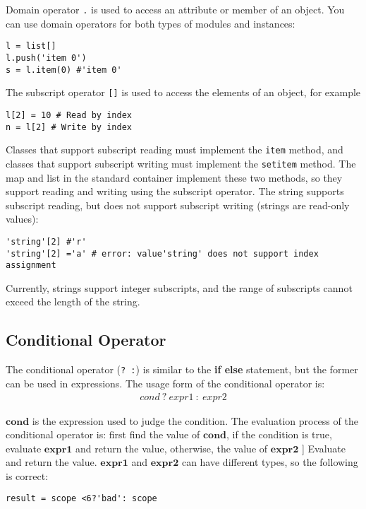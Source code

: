 Domain operator \texttt{.} is used to access an attribute or member of an object. You can use domain operators for both types of modules and instances:
\begin{lstlisting}[language=berry, numbers=none]
l = list[]
l.push('item 0')
s = l.item(0) #'item 0'
\end{lstlisting}

The subscript operator \texttt{[]} is used to access the elements of an object, for example
\begin{lstlisting}[language=berry, numbers=none]
l[2] = 10 # Read by index
n = l[2] # Write by index
\end{lstlisting}

Classes that support subscript reading must implement the \texttt{item} method, and classes that support subscript writing must implement the \texttt{setitem} method. The map and list in the standard container implement these two methods, so they support reading and writing using the subscript operator. The string supports subscript reading, but does not support subscript writing (strings are read-only values):
\begin{lstlisting}[language=berry, numbers=none]
'string'[2] #'r'
'string'[2] ='a' # error: value'string' does not support index assignment
\end{lstlisting}

Currently, strings support integer subscripts, and the range of subscripts cannot exceed the length of the string.

\subsection {Conditional Operator}The conditional operator (\texttt{? :}) is similar to the \textbf{if else} statement, but the former can be used in expressions. The usage form of the conditional operator is: \vspace{-0.5em}
\begin{gather*}
    cond\ \bm{?}\ expr1\ \bm{:}\ expr2
\end{gather*}

$\bm{cond}$ is the expression used to judge the condition. The evaluation process of the conditional operator is: first find the value of $\bm{cond}$, if the condition is true, evaluate $\bm{expr1}$ and return the value, otherwise, the value of $\bm{expr2}$ ] Evaluate and return the value. $\bm{expr1}$ and $\bm{expr2}$ can have different types, so the following is correct:
\begin{lstlisting}[language=berry, numbers=none]
result = scope <6?'bad': scope
\end{lstlisting}

